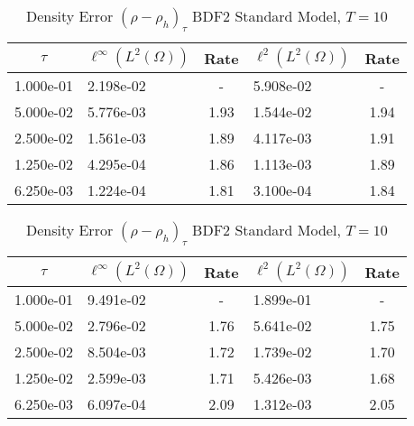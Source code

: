 \documentclass[letterpaper]{erdc}
\begin{document}
\begin{table}[h!]
  \parbox{.45\linewidth}{
  \tiny
  \centering
    \caption{Density Error $(\rho - \rho_h)_{\tau}$ BDF2 Rotational Model, $T=10$}
    \begin{tabular}{c|l|c|l|c}
      $\tau$  & $\ell^{\infty}\left(L^2(\Omega)\right)$ &  Rate  &  $\ell^2\left(L^2(\Omega)\right)$  &  Rate\\
      \hline
      1.000e-01 & 2.198e-02 &  -   & 5.908e-02 &  -  \\
      5.000e-02 & 5.776e-03 & 1.93 & 1.544e-02 & 1.94\\
      2.500e-02 & 1.561e-03 & 1.89 & 4.117e-03 & 1.91\\
      1.250e-02 & 4.295e-04 & 1.86 & 1.113e-03 & 1.89\\
      6.250e-03 & 1.224e-04 & 1.81 & 3.100e-04 & 1.84
    \end{tabular}
    }
    \hfill
    \parbox{.45\linewidth}{
    \tiny
    \centering
      \caption{Density Error $(\rho - \rho_h)_{\tau}$ BDF2 Standard Model, $T=10$}
      \begin{tabular}{c|l|c|l|c}
        $\tau$  & $\ell^{\infty}\left(L^2(\Omega)\right)$ &  Rate  &  $\ell^2\left(L^2(\Omega)\right)$  &  Rate\\
        \hline
        1.000e-01 & 9.491e-02 &  -   & 1.899e-01 &  -  \\
        5.000e-02 & 2.796e-02 & 1.76 & 5.641e-02 & 1.75\\
        2.500e-02 & 8.504e-03 & 1.72 & 1.739e-02 & 1.70\\
        1.250e-02 & 2.599e-03 & 1.71 & 5.426e-03 & 1.68\\
        6.250e-03 & 6.097e-04 & 2.09 & 1.312e-03 & 2.05
      \end{tabular}
    }
\end{table}
\end{document}
